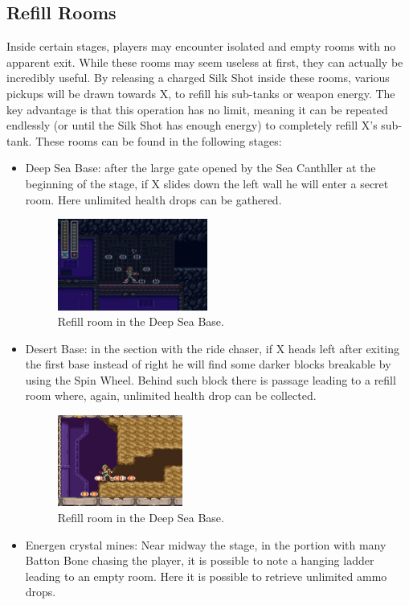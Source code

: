 \subsection{Refill Rooms}\label{sec:refill}
Inside certain stages, players may encounter isolated and empty rooms with no apparent exit. While these rooms may seem useless at first, they can actually be incredibly useful. By releasing a charged Silk Shot inside these rooms, various pickups will be drawn towards X, to refill his sub-tanks or weapon energy. The key advantage is that this operation has no limit, meaning it can be repeated endlessly (or until the Silk Shot has enough energy) to completely refill X's sub-tank. These rooms can be found in the following stages:
\begin{itemize}
	\item Deep Sea Base: after the large gate opened by the Sea Canthller at the beginning of the stage, if X slides down the left wall he will enter a secret room. Here unlimited health drops can be gathered.
	\begin{figure}[htp]
		\centering
		\includegraphics[height=3cm]{figures/X2/Bubble_crab/Crab_farming_spot.png}
		\caption{Refill room in the Deep Sea Base.}
	\end{figure}
	\item Desert Base: in the section with the ride chaser, if X heads left after exiting the first base instead of right he will find some darker blocks breakable by using the Spin  Wheel. Behind such block there is passage leading to a refill room where, again, unlimited health drop can be collected.
	\begin{figure}[htp]
		\centering
		\includegraphics[height=3cm]{figures/X2/Overdrive_ostrich/ostrich_refill.jpg}
		\caption{Refill room in the Deep Sea Base.}
	\end{figure}
	\item Energen crystal mines: Near midway the stage, in the portion with many Batton Bone chasing the player, it is possible to note a hanging ladder leading to an empty room. Here it is possible to retrieve unlimited ammo drops.

\end{itemize}
